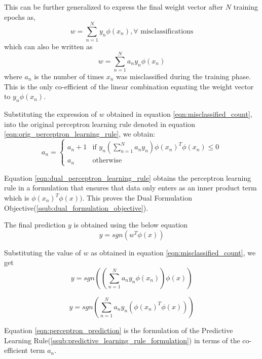 \documentclass[parskip=full]{scrartcl}
\begin{document}
        This can be further generalized to express the final weight vector after $N$ training epochs as,
        $$w = \sum_{n=1}^N y_n \phi(x_n), \forall \text{ misclassifications}$$
        which can also be written as
        \begin{equation} \label{eqn:misclassified_count}
            w = \sum_{n=1}^N a_n y_n \phi(x_n)
        \end{equation}
        where $a_n$ is the number of times $x_n$ was misclassified during the training phase. This is the only co-efficient of the linear combination equating the weight vector to $y_n \phi(x_n)$.


        Substituting the expression of $w$ obtained in equation \ref{eqn:misclassified_count}, into the original perceptron learning rule denoted in equation \ref{eqn:orig_perceptron_learning_rule}, we obtain:
        \begin{equation} \label{eqn:dual_perceptron_learning_rule}
            \boxed{
                a_n = 
                \begin{cases}
                    a_n + 1 & \text{if } y_n (\sum_{n=1}^N a_n y_n) \phi(x_n)^T\phi(x_n) \leq 0 \\
                    a_n     & \text{otherwise}
                \end{cases}
            }
        \end{equation}

        Equation \ref{eqn:dual_perceptron_learning_rule} obtains the perceptron learning rule in a formulation that ensures that data only enters as an inner product term which is $\phi(x_n)^T \phi(x))$. This proves the Dual Formulation Objective(\ref{ssub:dual_formulation_objective}).


        The final prediction $y$ is obtained using the below equation
        $$y = sgn(w^T \phi(x)) $$

        Substituting the value of $w$ as obtained in equation \ref{eqn:misclassified_count}, we get
        $$y = sgn((\sum_{n=1}^N a_n y_n \phi(x_n)) \phi(x)) $$

        \begin{equation} \label{eqn:perceptron_prediction}
            \boxed{
                y = sgn(\sum_{n=1}^N a_n y_n (\phi(x_n)^T \phi(x)))            
            }
        \end{equation}

        Equation \ref{eqn:perceptron_prediction} is the formulation of the Predictive Learning Rule(\ref{ssub:predictive_learning_rule_formulation}) in terms of the co-efficient term $a_n$.
    
\end{document}
